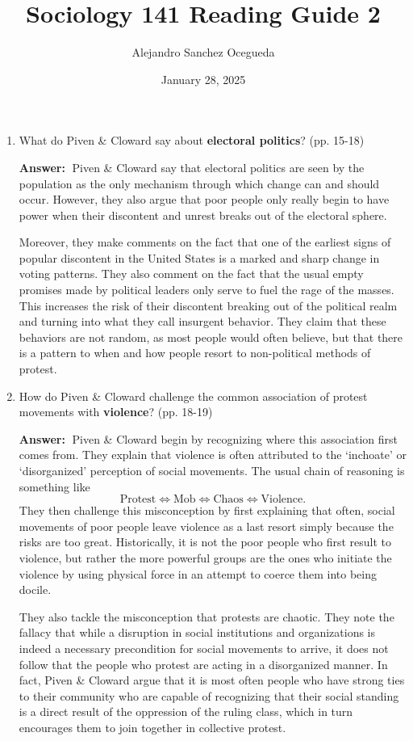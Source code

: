\documentclass{article}
\title{Sociology 141 Reading Guide 2}
\author{Alejandro Sanchez Ocegueda}
\date{January 28, 2025}
\newcommand{\answer}{\textbf{Answer:}$\;$}
\begin{document}
\maketitle

\begin{enumerate}[label=\arabic*)]
    \item What do Piven \& Cloward say about \textbf{electoral politics}? (pp. 15-18)

    \answer 
    Piven \& Cloward say that electoral politics are seen by the population as the only mechanism through which change can and should occur.
    However, they also argue that poor people only really begin to have power when their discontent and unrest breaks out of the electoral sphere.

    Moreover, they make comments on the fact that one of the earliest signs of popular discontent in the United States is a marked and sharp change in voting patterns.
    They also comment on the fact that the usual empty promises made by political leaders only serve to fuel the rage of the masses.
    This increases the risk of their discontent breaking out of the political realm and turning into what they call insurgent behavior.
    They claim that these behaviors are not random, as most people would often believe, but that there is a pattern to when and how people resort to non-political methods of protest.

    \item How do Piven \& Cloward challenge the common association of protest movements with \textbf{violence}? (pp. 18-19)

    \answer 
    Piven \& Cloward begin by recognizing where this association first comes from.
    They explain that violence is often attributed to the `inchoate' or `disorganized' perception of social movements.
    The usual chain of reasoning is something like
    $$\text{Protest} \Leftrightarrow \text{Mob} \Leftrightarrow \text{Chaos} \Leftrightarrow \text{Violence}.$$
    They then challenge this misconception by first explaining that often, social movements of poor people leave violence as a last resort simply because the risks are too great.
    Historically, it is not the poor people who first result to violence, but rather the more powerful groups are the ones who initiate the violence by using physical force in an attempt to coerce them into being docile.

    They also tackle the misconception that protests are chaotic.
    They note the fallacy that while a disruption in social institutions and organizations is indeed a necessary precondition for social movements to arrive, it does not follow that the people who protest are acting in a disorganized manner.
    In fact, Piven \& Cloward argue that it is most often people who have strong ties to their community who are capable of recognizing that their social standing is a direct result of the oppression of the ruling class, which in turn encourages them to join together in collective protest.


\end{enumerate}
\end{document}
